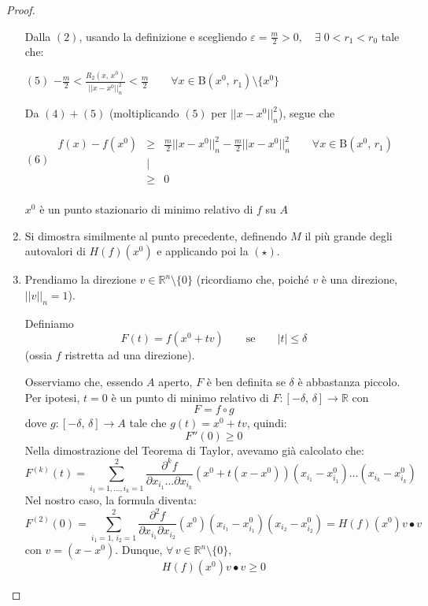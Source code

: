 \begin{proof}
\begin{enumerate}[labelindent=\parindent,leftmargin=*,label=\textnormal{(\roman*)},start=1]
Dalla $\mathrm{(2)}$, usando la definizione e scegliendo $\varepsilon = \frac{m}{2} > 0, \quad \exists \; 0 < r_1 < r_0$ tale che:
\begin{center}
$\mathrm{(5)}$
\hfill
$\displaystyle
-\frac{m}{2} < \frac{R_2(x,\,x^0)}{||x-x^0||_n^2} < \frac{m}{2} \qquad \forall x \in \mathrm{B}(x^0,\,r_1) \setminus \lbrace x^0 \rbrace
$
\hfill \null \\
\end{center}
Da $\mathrm{(4)} + \mathrm{(5)}$ (moltiplicando $\mathrm{(5)}$ per $||x-x^0||_n^2$), segue che
\begin{center}
$\mathrm{(6)}$
\hfill
$\displaystyle
\begin{array}{rcl}
f(x) - f(x^0) & \geq & \frac{m}{2}||x-x^0||_n^2 - \frac{m}{2}||x-x^0||_n^2 \qquad \forall x \in \mathrm{B}(x^0,\,r_1)\\ 
& \big\lvert & \\
& \geq & 0
\end{array}
$
\hfill \null \\
 \\
$x^0$ è un punto stazionario di minimo relativo di $f$ su $A$
\end{center}

\item Si dimostra similmente al punto precedente, definendo $M$ il più grande degli autovalori di $H(f)(x^0)$ e applicando poi la $\mathrm{(\star)}$.

\item Prendiamo la direzione $v \in \mathbb{R}^n \setminus \lbrace 0 \rbrace$ (ricordiamo che, poiché $v$ è una direzione, $||v||_n = 1$).
\begin{center}
\def\svgwidth{8cm}

\end{center}
Definiamo
$$
F(t) = f(x^0 + tv) \qquad \text{se} \qquad |t| \leq \delta
$$
(ossia $f$ ristretta ad una direzione).

Osserviamo che, essendo $A$ aperto, $F$ è ben definita se $\delta$ è abbastanza piccolo. Per ipotesi, $t = 0$ è un punto di minimo relativo di $F : [-\delta,\,\delta] \longrightarrow \mathbb{R}$ con
$$
F = f \circ g
$$
dove $g : [-\delta,\,\delta] \longrightarrow A$ tale che $g(t) = x^0 + tv$, quindi:
$$
F''(0) \geq 0
$$
Nella dimostrazione del Teorema di Taylor, avevamo già calcolato che:
$$
F^{(k)}(t) = 
\sum_{i_1=1,\ldots,i_k=1}^2
\frac{\partial^k f}{\partial x_{i_1} \ldots \partial x_{i_k}}(x^0+t(x-x^0))
(x_{i_1}-x_{i_1}^0) \ldots (x_{i_k}-x_{i_k}^0)
$$
Nel nostro caso, la formula diventa:
$$
F^{(2)}(0) = 
\sum_{i_1=1,\,i_2=1}^2
\frac{\partial^2 f}{\partial x_{i_1} \partial x_{i_2}}(x^0)
(x_{i_1}-x_{i_1}^0)(x_{i_2}-x_{i_2}^0) =
H(f)(x^0)v \bullet v
$$
con $v = (x-x^0)$. Dunque, $\forall \, v \in \mathbb{R}^n \setminus \lbrace 0 \rbrace$,
$$
H(f)(x^0)v \bullet v \geq 0
$$
\end{enumerate}
\end{proof}

